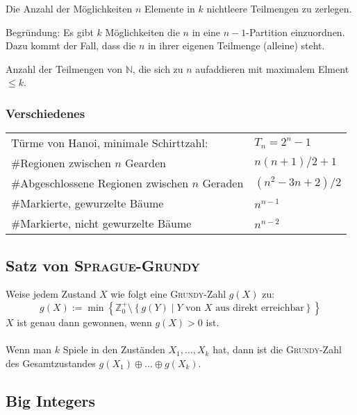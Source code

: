\begin{bem}
	Die Anzahl der Möglichkeiten $n$ Elemente in $k$ nichtleere Teilmengen zu zerlegen.

	Begründung: Es gibt $k$ Möglichkeiten die $n$ in eine $n-1$-Partition
	einzuordnen. Dazu kommt der Fall, dass die $n$ in ihrer eigenen Teilmenge
	(alleine) steht.
\end{bem}

\begin{bem}
	Anzahl der Teilmengen von $\mathbb{N}$, die sich zu $n$ aufaddieren mit
	maximalem Elment $\leq k$.
\end{bem}

\subsubsection{Verschiedenes}
\begin{tabular}{|l|l|}
	\hline
	Türme von Hanoi, minimale Schirttzahl:					& $T_n = 2^n - 1$ \\
	\#Regionen zwischen $n$ Gearden									& $n\left(n + 1\right) / 2 + 1$ \\
	\#Abgeschlossene Regionen zwischen $n$ Geraden	& $\left(n^2 - 3n + 2\right) / 2$ \\
	\#Markierte, gewurzelte Bäume										& $n^{n-1}$ \\
	\#Markierte, nicht gewurzelte Bäume							& $n^{n-2}$ \\
	\hline
\end{tabular}

\subsection{Satz von \textsc{Sprague-Grundy}}
Weise jedem Zustand $X$ wie folgt eine \textsc{Grundy}-Zahl $g\left(X\right)$ zu:
\[
	g\left(X\right) := \min\left\{
		\mathbb{Z}_0^+ \setminus
		\left\{g\left(Y\right) \mid Y \text{ von } X \text{ aus direkt erreichbar}\right\}
	\right\} 
\]
$X$ ist genau dann gewonnen, wenn $g\left(X\right) > 0$ ist.\\\\
Wenn man $k$ Spiele in den Zuständen $X_1, \ldots, X_k$ hat, dann ist die \textsc{Grundy}-Zahl des Gesamtzustandes $g\left(X_1\right) \oplus \ldots \oplus g\left(X_k\right)$.

\subsection{Big Integers}

